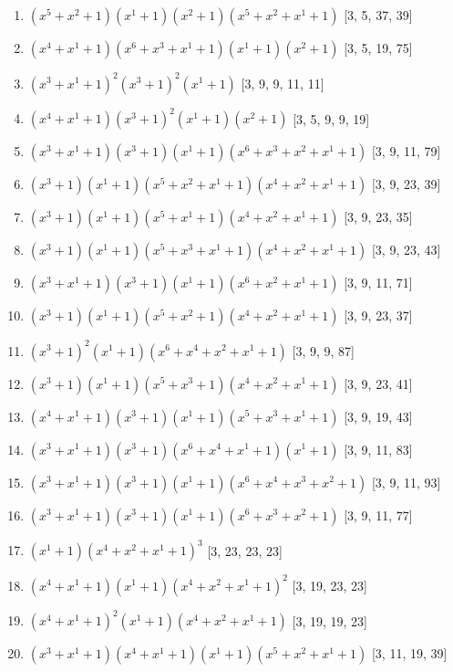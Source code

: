 \documentclass[10pt,twocolumn]{article}
\begin{document}
\begin{enumerate}
\item $(x^{5} + x^{2} + 1)(x^{1} + 1)(x^{2} + 1)(x^{5} + x^{2} + x^{1} + 1)$  [3, 5, 37, 39]
\item $(x^{4} + x^{1} + 1)(x^{6} + x^{3} + x^{1} + 1)(x^{1} + 1)(x^{2} + 1)$  [3, 5, 19, 75]
\item $(x^{3} + x^{1} + 1)^{2}(x^{3} + 1)^{2}(x^{1} + 1)$  [3, 9, 9, 11, 11]
\item $(x^{4} + x^{1} + 1)(x^{3} + 1)^{2}(x^{1} + 1)(x^{2} + 1)$  [3, 5, 9, 9, 19]
\item $(x^{3} + x^{1} + 1)(x^{3} + 1)(x^{1} + 1)(x^{6} + x^{3} + x^{2} + x^{1} + 1)$  [3, 9, 11, 79]
\item $(x^{3} + 1)(x^{1} + 1)(x^{5} + x^{2} + x^{1} + 1)(x^{4} + x^{2} + x^{1} + 1)$  [3, 9, 23, 39]
\item $(x^{3} + 1)(x^{1} + 1)(x^{5} + x^{1} + 1)(x^{4} + x^{2} + x^{1} + 1)$  [3, 9, 23, 35]
\item $(x^{3} + 1)(x^{1} + 1)(x^{5} + x^{3} + x^{1} + 1)(x^{4} + x^{2} + x^{1} + 1)$  [3, 9, 23, 43]
\item $(x^{3} + x^{1} + 1)(x^{3} + 1)(x^{1} + 1)(x^{6} + x^{2} + x^{1} + 1)$  [3, 9, 11, 71]
\item $(x^{3} + 1)(x^{1} + 1)(x^{5} + x^{2} + 1)(x^{4} + x^{2} + x^{1} + 1)$  [3, 9, 23, 37]
\item $(x^{3} + 1)^{2}(x^{1} + 1)(x^{6} + x^{4} + x^{2} + x^{1} + 1)$  [3, 9, 9, 87]
\item $(x^{3} + 1)(x^{1} + 1)(x^{5} + x^{3} + 1)(x^{4} + x^{2} + x^{1} + 1)$  [3, 9, 23, 41]
\item $(x^{4} + x^{1} + 1)(x^{3} + 1)(x^{1} + 1)(x^{5} + x^{3} + x^{1} + 1)$  [3, 9, 19, 43]
\item $(x^{3} + x^{1} + 1)(x^{3} + 1)(x^{6} + x^{4} + x^{1} + 1)(x^{1} + 1)$  [3, 9, 11, 83]
\item $(x^{3} + x^{1} + 1)(x^{3} + 1)(x^{1} + 1)(x^{6} + x^{4} + x^{3} + x^{2} + 1)$  [3, 9, 11, 93]
\item $(x^{3} + x^{1} + 1)(x^{3} + 1)(x^{1} + 1)(x^{6} + x^{3} + x^{2} + 1)$  [3, 9, 11, 77]
\item $(x^{1} + 1)(x^{4} + x^{2} + x^{1} + 1)^{3}$  [3, 23, 23, 23]
\item $(x^{4} + x^{1} + 1)(x^{1} + 1)(x^{4} + x^{2} + x^{1} + 1)^{2}$  [3, 19, 23, 23]
\item $(x^{4} + x^{1} + 1)^{2}(x^{1} + 1)(x^{4} + x^{2} + x^{1} + 1)$  [3, 19, 19, 23]
\item $(x^{3} + x^{1} + 1)(x^{4} + x^{1} + 1)(x^{1} + 1)(x^{5} + x^{2} + x^{1} + 1)$  [3, 11, 19, 39]

\end{enumerate}
\end{document}
